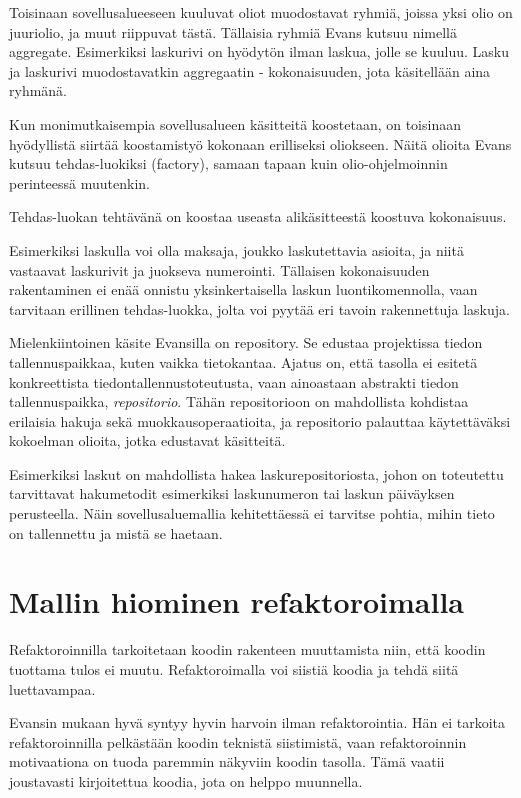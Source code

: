 Toisinaan sovellusalueeseen kuuluvat oliot muodostavat ryhmiä, joissa
yksi olio on juuriolio, ja muut riippuvat tästä. Tällaisia ryhmiä Evans
kutsuu nimellä \gls{aggregate}. Esimerkiksi laskurivi on hyödytön ilman
laskua, jolle se kuuluu. Lasku ja laskurivi muodostavatkin aggregaatin -
kokonaisuuden, jota käsitellään aina ryhmänä.

Kun monimutkaisempia sovellusalueen käsitteitä koostetaan, on toisinaan
hyödyllistä siirtää koostamistyö kokonaan erilliseksi oliokseen. Näitä
olioita Evans kutsuu tehdas-luokiksi (factory), samaan tapaan kuin
olio-ohjelmoinnin perinteessä muutenkin.

Tehdas-luokan tehtävänä on koostaa useasta alikäsitteestä koostuva
kokonaisuus.

Esimerkiksi laskulla voi olla maksaja, joukko laskutettavia asioita, ja
niitä vastaavat laskurivit ja juokseva numerointi. Tällaisen
kokonaisuuden rakentaminen ei enää onnistu yksinkertaisella laskun
luontikomennolla, vaan tarvitaan erillinen tehdas-luokka, jolta voi
pyytää eri tavoin rakennettuja laskuja.

Mielenkiintoinen käsite Evansilla on \gls{repository}. Se edustaa
projektissa tiedon tallennuspaikkaa, kuten vaikka tietokantaa. Ajatus
on, että  tasolla ei esitetä
konkreettista tiedontallennustoteutusta, vaan ainoastaan abstrakti
tiedon tallennuspaikka, \emph{repositorio}. Tähän repositorioon on
mahdollista kohdistaa erilaisia hakuja sekä muokkausoperaatioita, ja
repositorio palauttaa käytettäväksi kokoelman olioita, jotka edustavat
 käsitteitä.

Esimerkiksi laskut on mahdollista hakea laskurepositoriosta, johon on
toteutettu tarvittavat hakumetodit esimerkiksi laskunumeron tai laskun
päiväyksen perusteella. Näin sovellusaluemallia kehitettäessä ei
tarvitse pohtia, mihin tieto on tallennettu ja mistä se haetaan.

\hypertarget{mallin-hiominen-refaktoroimalla}{%
\section{Mallin hiominen
refaktoroimalla}\label{mallin-hiominen-refaktoroimalla}}

Refaktoroinnilla tarkoitetaan koodin rakenteen muuttamista niin, että
koodin tuottama tulos ei muutu. Refaktoroimalla voi siistiä koodia ja
tehdä siitä luettavampaa.

Evansin mukaan hyvä  syntyy hyvin harvoin
ilman refaktorointia. Hän ei tarkoita refaktoroinnilla pelkästään koodin
teknistä siistimistä, vaan refaktoroinnin motivaationa on tuoda
 paremmin näkyviin koodin tasolla. Tämä vaatii
joustavasti kirjoitettua koodia, jota on helppo
muunnella.\cite[osa 3.]{evans:ddd}

